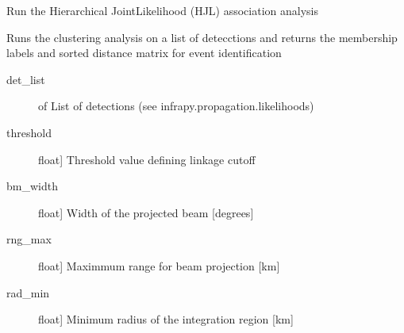 \documentclass[letterpaper,10pt,english]{sphinxmanual}
\begin{document}

\begin{fulllineitems}
\label{\detokenize{infrapy.association:infrapy.association.hjl.compute_assoc_pair_wrapper}}
\end{fulllineitems}


\begin{fulllineitems}
\label{\detokenize{infrapy.association:infrapy.association.hjl.run}}
Run the Hierarchical Joint\sphinxhyphen{}Likelihood (HJL) association analysis

Runs the clustering analysis on a list of detecctions and returns the
membership labels and sorted distance matrix for event identification
\begin{description}
\item[{det\_list}] \leavevmode{[} of \sphinxcode{\sphinxupquote{InfrasoundDetection}}{]}
List of detections (see infrapy.propagation.likelihoods)

\item[{threshold}] \leavevmode{[}float{]}
Threshold value defining linkage cutoff

\item[{bm\_width}] \leavevmode{[}float{]}
Width of the projected beam {[}degrees{]}

\item[{rng\_max}] \leavevmode{[}float{]}
Maximmum range for beam projection {[}km{]}

\item[{rad\_min}] \leavevmode{[}float{]}
Minimum radius of the integration region {[}km{]}


\end{description}
\end{fulllineitems}
\end{document}
